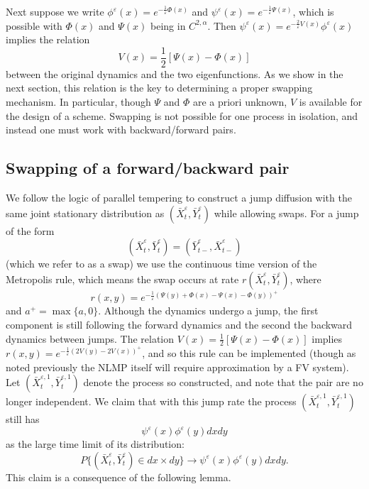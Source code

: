 \documentclass[english,11pt]{article}%
\numberwithin{equation}{section}
\numberwithin{example}{section}
\numberwithin{theorem}{section}
\begin{document}
Next suppose we write $\phi^{\varepsilon}(x)=e^{-\frac{1}{\varepsilon}\Phi
(x)}$ and $\psi^{\varepsilon}(x)=e^{-\frac{1}{\varepsilon}\Psi(x)}$, which is
possible with $\Phi(x)$ and $\Psi(x)$ being in $C^{2,\alpha}$. Then
$\psi^{\varepsilon}(x)=e^{-\frac{2}{\varepsilon}V(x)}\phi^{\varepsilon}(x)$
implies the relation
\[
V(x)=\frac{1}{2}[\Psi(x)-\Phi(x)]
\]
between the original dynamics and the two eigenfunctions. As we show in the
next section, this relation is the key to determining a proper swapping
mechanism. In particular, though $\Psi$ and $\Phi$ are a priori unknown, $V$
is available for the design of a scheme. Swapping is not possible for one
process in isolation, and instead one must work with backward/forward pairs.

\subsection{Swapping of a forward/backward pair}

\label{sec:swap} We follow the logic of parallel tempering to construct a jump
diffusion with the same joint stationary distribution as $(\bar{X}%
_{t}^{\varepsilon},\bar{Y}_{t}^{\varepsilon})$ while allowing swaps. For a
jump of the form
\[
(\bar{X}_{t}^{\varepsilon},\bar{Y}_{t}^{\varepsilon})=(\bar{Y}_{t-}%
^{\varepsilon},\bar{X}_{t-}^{\varepsilon})
\]
(which we refer to as a swap) we use the continuous time version of the
Metropolis rule, which means the swap occurs at rate $r(\bar{X}_{t}%
^{\varepsilon},\bar{Y}_{t}^{\varepsilon})$, where
\[
r(x,y)=e^{-\frac{1}{\varepsilon}\left(  \Psi(y)+\Phi(x)-\Psi(x)-\Phi
(y)\right)  ^{+}}%
\]
and $a^{+}=\max\{a,0\}$. Although the dynamics undergo a jump, the first
component is still following the forward dynamics and the second the backward
dynamics between jumps. The relation $V(x)=\frac{1}{2}\left[  \Psi(x)-\Phi(x)\right]  $
implies $r(x,y)=e^{-\frac{1}{\varepsilon}(2V(y)-2V(x))^{+}}$, and so this rule
can be implemented (though as noted previously the NLMP itself will require
approximation by a FV system). Let $(\bar{X}_{t}^{\varepsilon,1},\bar{Y}%
_{t}^{\varepsilon,1})$ denote the process so constructed, and note that the
pair are no longer independent. We claim that with this jump rate the process
$(\bar{X}_{t}^{\varepsilon,1},\bar{Y}_{t}^{\varepsilon,1})$ still has%
\[
\psi^{\varepsilon}(x)\phi^{\varepsilon}(y)dxdy
\]
as the large time limit of its distribution:
\begin{equation}
P\{(\bar{X}_{t}^{\varepsilon},\bar{Y}_{t}^{\varepsilon})\in dx\times
dy\}\rightarrow\psi^{\varepsilon}(x)\phi^{\varepsilon}(y)dxdy.
\label{eqn:empmconv}%
\end{equation}
This claim is a consequence of the following lemma.
\end{document}
